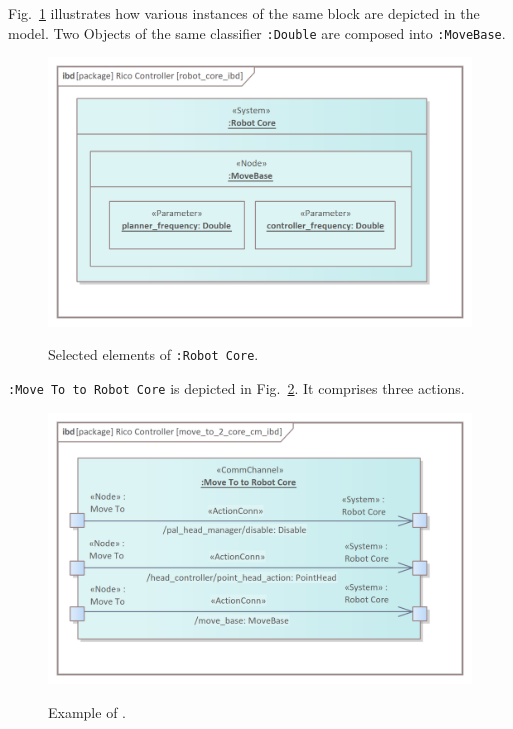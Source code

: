 \documentclass[11pt,oneside,a4paper]{report}
\begin{document}
	Fig.~\ref{fig:robot_core_ibd} illustrates how various instances of the same block are depicted in the model. Two \stParameter{} Objects of the same classifier \texttt{:Double} are composed into \stNode{} \texttt{:MoveBase}.
	
	\begin{figure}[H]
		\centering
		\begin{center}
			{\includegraphics[scale=.85]{img/rico_pkg/robot_core_ibd.png}}
		\end{center}
		\caption{Selected elements of \stSystem{} \texttt{:Robot Core}.} 
		\label{fig:robot_core_ibd}
	\end{figure}
				
	\stCommChannel{} \texttt{:Move To to Robot Core} is depicted in Fig.~\ref{fig:move_to_2_core_cm_ibd}. It comprises three actions.
	

	\begin{figure}[H]
		\centering
		\begin{center}
			{\includegraphics[scale=1.1]{img/rico_pkg/move_to_2_core_cm_ibd.png}}
		\end{center}
		\caption{Example of \stCommChannel{}.} 
		\label{fig:move_to_2_core_cm_ibd}
	\end{figure}
	
\end{document}
